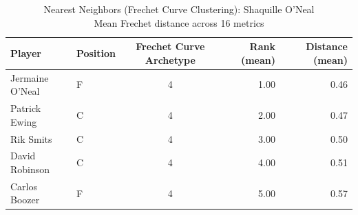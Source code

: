 \begin{table}[t]
\caption*{
{\fontsize{20}{25} Nearest Neighbors (Frechet Curve Clustering): Shaquille O'Neal\fontsize{12}{15}\selectfont } \\ 
{\fontsize{14}{17}\selectfont  Mean Frechet distance across 16 metrics\fontsize{12}{15}\selectfont }
} 
\fontsize{12.0pt}{14.0pt}\selectfont
\begin{tabular*}{\linewidth}{@{\extracolsep{\fill}}llcrr}
\toprule
Player & Position & Frechet Curve Archetype & Rank (mean) & Distance (mean) \\ 
\midrule\addlinespace[2.5pt]
Jermaine O'Neal & F & 4 & 1.00 & 0.46 \\ 
Patrick Ewing & C & 4 & 2.00 & 0.47 \\ 
Rik Smits & C & 4 & 3.00 & 0.50 \\ 
David Robinson & C & 4 & 4.00 & 0.51 \\ 
Carlos Boozer & F & 4 & 5.00 & 0.57 \\ 
\bottomrule
\end{tabular*}
\end{table}


